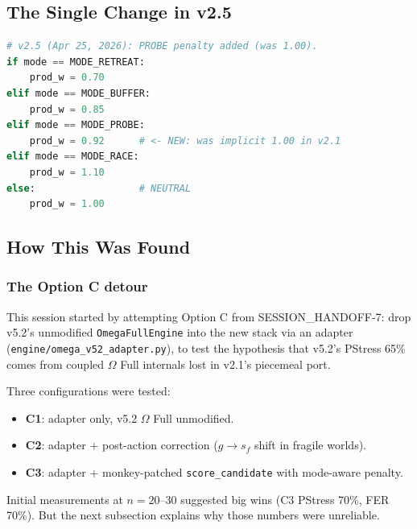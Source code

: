 \subsection{The Single Change in v2.5}
\label{sec:methodology-v25-change}


\begin{lstlisting}[language=Python,basicstyle=\ttfamily\small,frame=single]
# v2.5 (Apr 25, 2026): PROBE penalty added (was 1.00).
if mode == MODE_RETREAT:
    prod_w = 0.70
elif mode == MODE_BUFFER:
    prod_w = 0.85
elif mode == MODE_PROBE:
    prod_w = 0.92      # <- NEW: was implicit 1.00 in v2.1
elif mode == MODE_RACE:
    prod_w = 1.10
else:                  # NEUTRAL
    prod_w = 1.00
\end{lstlisting}

\subsection{How This Was Found}
\label{sec:methodology-v25-discovery}

\subsubsection{The Option C detour}

This session started by attempting Option C from
SESSION\_HANDOFF-7: drop v5.2's unmodified \texttt{OmegaFullEngine}
into the new stack via an adapter
(\texttt{engine/omega\_v52\_adapter.py}), to test the hypothesis
that v5.2's PStress 65\% comes from coupled $\Omega$ Full internals
lost in v2.1's piecemeal port.

Three configurations were tested:

\begin{itemize}
\item \textbf{C1}: adapter only, v5.2 $\Omega$ Full unmodified.
\item \textbf{C2}: adapter + post-action correction
($g \to s_f$ shift in fragile worlds).
\item \textbf{C3}: adapter + monkey-patched
\texttt{score\_candidate} with mode-aware penalty.
\end{itemize}

Initial measurements at $n = 20$--30 suggested big wins
(C3 PStress 70\%, FER 70\%). But the next subsection explains why
those numbers were unreliable.

